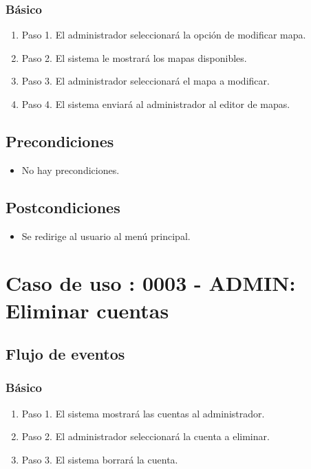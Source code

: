 \subsubsection{Básico}

\begin{enumerate}
\item Paso 1.
El administrador seleccionará la opción de modificar mapa.
\item Paso 2.
El sistema le mostrará los mapas disponibles.
\item Paso 3.
El administrador seleccionará el mapa a modificar.
\item Paso 4.
El sistema enviará al administrador al editor de mapas.
\end{enumerate}

\subsection{Precondiciones}
\begin{itemize}
\item No hay precondiciones.
\end{itemize}

\subsection{Postcondiciones}
\begin{itemize}
\item Se redirige al usuario al menú principal.
\end{itemize}



\section{Caso de uso : 0003 - ADMIN: Eliminar cuentas}\label{sec:uc0}
\subsection{Flujo de eventos}
\subsubsection{Básico}

\begin{enumerate}
\item Paso 1.
El sistema mostrará las cuentas al administrador.
\item Paso 2.
El administrador seleccionará la cuenta a eliminar.
\item Paso 3.
El sistema borrará la cuenta.
\end{enumerate}

